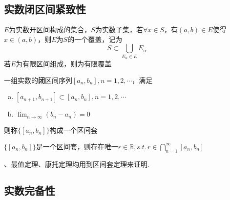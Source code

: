 \subsection{实数闭区间紧致性}
\begin{definition}[覆盖]
$E$为实数开区间构成的集合，$S$为实数子集，若$\forall x\in S$，有$(a,b)\in E$使得$x\in(a,b)$，则$E$为$S$的一个覆盖，记为
\[S\subset\bigcup_{E_\alpha\in E}E_\alpha\]
若$E$为有限区间组成，则为有限覆盖
\end{definition}
\begin{definition}[区间套]
一组实数的\textbf{闭}区间序列$[a_n,b_n],n=1,2,\cdots$，满足
\begin{enumerate}[a.]
	\item $[a_{n+1},b_{n+1}]\subset[a_n,b_n],n=1,2,\cdots$
	\item $\displaystyle\lim_{n\to\infty}(b_n-a_n)=0$
\end{enumerate}
则称$\{[a_n,b_n]\}$构成一个区间套
\end{definition}
\begin{theorem}[区间套定理]
$\{[a_n,b_n]\}$是一个区间套，则存在唯一$\displaystyle r\in\mathbb{R},s.t.\,r\in\bigcap_{n=1}^{\infty}[a_n,b_n]$
\end{theorem}
、最值定理、康托定理均用到区间套定理来证明.

\subsection{实数完备性}